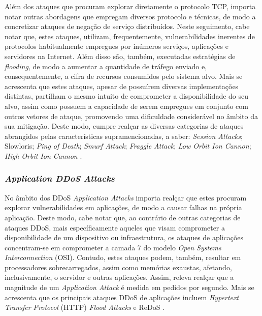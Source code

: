Além dos ataques que procuram explorar diretamente o protocolo TCP, importa notar outras abordagens que empregam diversos protocolo e técnicas, de modo a concretizar ataques de negação de serviço distribuídos. Neste seguimento, cabe notar que, estes ataques, utilizam, frequentemente, vulnerabilidades inerentes de protocolos habitualmente empregues por inúmeros serviços, aplicações e servidores na Internet. Além disso são, também, executadas estratégias de \textit{flooding}, de modo a aumentar a quantidade de tráfego enviado e, consequentemente, a cifra de recursos consumidos pelo sistema alvo. Mais se acrescenta que estes ataques, apesar de possuírem diversas implementações distintas, partilham o mesmo intuito de comprometer a disponibilidade do seu alvo, assim como possuem a capacidade de serem empregues em conjunto com outros vetores de ataque, promovendo uma dificuldade considerável no âmbito da sua mitigação. Deste modo, cumpre realçar as diversas categorias de ataques abrangidos pelas características supramencionadas, a saber: \textit{Session Attacks}; Slowloris; \textit{Ping of Death}; \textit{Smurf Attack}; \textit{Fraggle Attack}; \textit{Low Orbit Ion Cannon}; \textit{High Orbit Ion Cannon} \cite{esecurityplanet_types_of_ddos_attacks,connectwise_types_of_ddos_attacks}.

\subsubsection{\textit{Application DDoS Attacks}}
No âmbito dos DDoS \textit{Application Attacks} importa realçar que estes procuram explorar vulnerabilidades em aplicações, de modo a causar falhas na própria aplicação. Deste modo, cabe notar que, ao contrário de outras categorias de ataques DDoS, mais específicamente aqueles que visam comprometer a disponibilidade de um dispositivo ou infraestrutura, os ataques de aplicações concentram-se em comprometer a camada 7 do modelo \textit{Open Systems Interconnection} (OSI). Contudo, estes ataques podem, também, resultar em processadores sobrecarregados, assim como memórias exaustas, afetando, inclusivamente, o servidor e outras aplicações. Assim, releva realçar que a magnitude de um \textit{Application Attack} é medida em pedidos por segundo. Mais se acrescenta que os principais ataques DDoS de aplicações incluem \textit{Hypertext Transfer Protocol} (HTTP) \textit{Flood Attacks} e ReDoS \cite{esecurityplanet_types_of_ddos_attacks,connectwise_types_of_ddos_attacks}.


